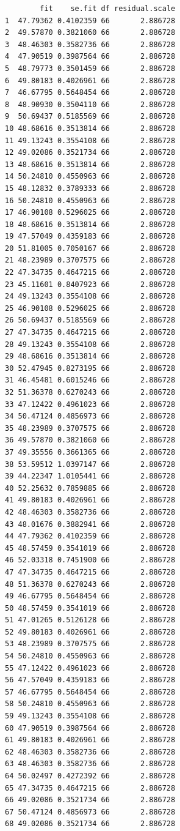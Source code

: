 \documentclass[
  letterpaper,
  DIV=11,
  numbers=noendperiod]{scrartcl}
\begin{document}
\begin{verbatim}
        fit    se.fit df residual.scale
1  47.79362 0.4102359 66       2.886728
2  49.57870 0.3821060 66       2.886728
3  48.46303 0.3582736 66       2.886728
4  47.90519 0.3987564 66       2.886728
5  48.79773 0.3501459 66       2.886728
6  49.80183 0.4026961 66       2.886728
7  46.67795 0.5648454 66       2.886728
8  48.90930 0.3504110 66       2.886728
9  50.69437 0.5185569 66       2.886728
10 48.68616 0.3513814 66       2.886728
11 49.13243 0.3554108 66       2.886728
12 49.02086 0.3521734 66       2.886728
13 48.68616 0.3513814 66       2.886728
14 50.24810 0.4550963 66       2.886728
15 48.12832 0.3789333 66       2.886728
16 50.24810 0.4550963 66       2.886728
17 46.90108 0.5296025 66       2.886728
18 48.68616 0.3513814 66       2.886728
19 47.57049 0.4359183 66       2.886728
20 51.81005 0.7050167 66       2.886728
21 48.23989 0.3707575 66       2.886728
22 47.34735 0.4647215 66       2.886728
23 45.11601 0.8407923 66       2.886728
24 49.13243 0.3554108 66       2.886728
25 46.90108 0.5296025 66       2.886728
26 50.69437 0.5185569 66       2.886728
27 47.34735 0.4647215 66       2.886728
28 49.13243 0.3554108 66       2.886728
29 48.68616 0.3513814 66       2.886728
30 52.47945 0.8273195 66       2.886728
31 46.45481 0.6015246 66       2.886728
32 51.36378 0.6270243 66       2.886728
33 47.12422 0.4961023 66       2.886728
34 50.47124 0.4856973 66       2.886728
35 48.23989 0.3707575 66       2.886728
36 49.57870 0.3821060 66       2.886728
37 49.35556 0.3661365 66       2.886728
38 53.59512 1.0397147 66       2.886728
39 44.22347 1.0105441 66       2.886728
40 52.25632 0.7859885 66       2.886728
41 49.80183 0.4026961 66       2.886728
42 48.46303 0.3582736 66       2.886728
43 48.01676 0.3882941 66       2.886728
44 47.79362 0.4102359 66       2.886728
45 48.57459 0.3541019 66       2.886728
46 52.03318 0.7451900 66       2.886728
47 47.34735 0.4647215 66       2.886728
48 51.36378 0.6270243 66       2.886728
49 46.67795 0.5648454 66       2.886728
50 48.57459 0.3541019 66       2.886728
51 47.01265 0.5126128 66       2.886728
52 49.80183 0.4026961 66       2.886728
53 48.23989 0.3707575 66       2.886728
54 50.24810 0.4550963 66       2.886728
55 47.12422 0.4961023 66       2.886728
56 47.57049 0.4359183 66       2.886728
57 46.67795 0.5648454 66       2.886728
58 50.24810 0.4550963 66       2.886728
59 49.13243 0.3554108 66       2.886728
60 47.90519 0.3987564 66       2.886728
61 49.80183 0.4026961 66       2.886728
62 48.46303 0.3582736 66       2.886728
63 48.46303 0.3582736 66       2.886728
64 50.02497 0.4272392 66       2.886728
65 47.34735 0.4647215 66       2.886728
66 49.02086 0.3521734 66       2.886728
67 50.47124 0.4856973 66       2.886728
68 49.02086 0.3521734 66       2.886728
\end{verbatim}
\end{document}
